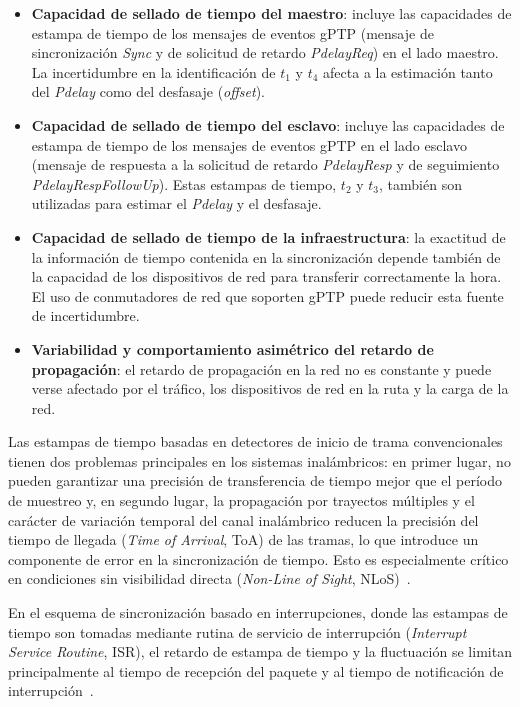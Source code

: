 \begin{itemize}
\item \textbf{Capacidad de sellado de tiempo del maestro}: incluye las capacidades de estampa de tiempo de los mensajes de eventos gPTP (mensaje de sincronización \textit{Sync} y de solicitud de retardo \textit{PdelayReq}) en el lado maestro. La incertidumbre en la identificación de $t_1$ y $t_4$ afecta a la estimación tanto del \textit{Pdelay} como del desfasaje (\textit{offset}).

\item \textbf{Capacidad de sellado de tiempo del esclavo}: incluye las capacidades de estampa de tiempo de los mensajes de eventos gPTP en el lado esclavo (mensaje de respuesta a la solicitud de retardo \textit{PdelayResp} y de seguimiento \textit{PdelayRespFollowUp}). Estas estampas de tiempo, $t_2$ y $t_3$, también son utilizadas para estimar el \textit{Pdelay} y el desfasaje.

\item \textbf{Capacidad de sellado de tiempo de la infraestructura}: la exactitud de la información de tiempo contenida en la sincronización depende también de la capacidad de los dispositivos de red para transferir correctamente la hora. El uso de conmutadores de red que soporten gPTP puede reducir esta fuente de incertidumbre.

\item \textbf{Variabilidad y comportamiento asimétrico del retardo de propagación}: el retardo de propagación en la red no es constante y puede verse afectado por el tráfico, los dispositivos de red en la ruta y la carga de la red.
\end{itemize}

Las estampas de tiempo basadas en detectores de inicio de trama convencionales tienen dos problemas principales en los sistemas inalámbricos: en primer lugar, no pueden garantizar una precisión de transferencia de tiempo mejor que el período de muestreo y, en segundo lugar, la propagación por trayectos múltiples y el carácter de variación temporal del canal inalámbrico reducen la precisión del tiempo de llegada (\textit{Time of Arrival}, ToA) de las tramas, lo que introduce un componente de error en la sincronización de tiempo. Esto es especialmente crítico en condiciones sin visibilidad directa (\textit{Non-Line of Sight}, NLoS)~\cite{seijo2020}.

En el esquema de sincronización basado en interrupciones, donde las estampas de tiempo son tomadas mediante rutina de servicio de interrupción (\textit{Interrupt Service Routine}, ISR), el retardo de estampa de tiempo y la fluctuación se limitan principalmente al tiempo de recepción del paquete y al tiempo de notificación de interrupción~\cite{mahmood2011}.

